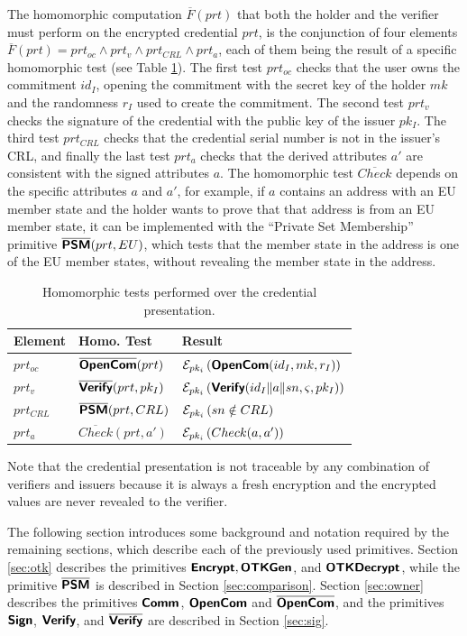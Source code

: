 The homomorphic computation $\overline{F}(prt)$ that both the holder and the verifier must perform on the encrypted credential $prt$, is the conjunction of four elements $\overline{F}(prt) = prt_{oc} \wedge prt_v \wedge prt_{CRL} \wedge prt_a$, each of them being the result of a specific homomorphic test (see Table \ref{tab:hcomp}).
The first test $prt_{oc}$ checks that the user owns the commitment $id_I$, opening the commitment with the secret key of the holder $mk$ and the randomness $r_I$ used to create the commitment. The second test $prt_v$ checks the signature of the credential with the public key of the issuer $pk_I$. The third test $prt_{CRL}$ checks that the credential serial number is not in the issuer's CRL, and finally the last test $prt_a$ checks that the derived attributes $a'$ are consistent with the signed attributes $a$. The homomorphic test $\overline{Check}$ depends on the specific attributes $a$ and $a'$, for example, if $a$ contains an address with an EU member state and the holder wants to prove that that address is from an EU member state, it can be implemented with the ``Private Set Membership'' primitive $\overline{\bkw{PSM}}(prt,EU)$, which tests that the member state in the address is one of the EU member states, without revealing the member state in the address. 

\begin{table}[ht]
    \renewcommand*{\arraystretch}{1.3}
    \centering
    \begin{tabular}{l|l|l}\hline
         Element & Homo. Test & Result \\\hline
         $prt_{oc}$ & $\overline{\bkw{OpenCom}}(prt)$ & $\senc{\bkw{OpenCom}(id_I,mk,r_I)}{pk_i}$ \\\hline
         $prt_{v}$ & $\overline{\bkw{Verify}}(prt,pk_I)$ & $\senc{\bkw{Verify}(id_I \|a\|sn,\varsigma,pk_I)}{pk_i}$\\\hline
         $prt_{CRL}$ & $\overline{\bkw{PSM}}(prt,CRL)$ & $\senc{sn \notin CRL}{pk_i}$\\\hline
         $prt_a$ & $\overline{Check}(prt,a')$ & $\senc{Check(a,a')}{pk_i}$\\\hline
    \end{tabular}
    \caption{Homomorphic tests performed over the credential presentation.}
    \label{tab:hcomp}
\end{table}

Note that the credential presentation is not traceable by any combination of verifiers and issuers because it is always a fresh encryption and the encrypted values are never revealed to the verifier. 

The following section introduces some background and notation required by the remaining sections, which describe each of the previously used primitives. Section \ref{sec:otk} describes the primitives $\bkw{Encrypt},\bkw{OTKGen}$, and $\bkw{OTKDecrypt}$, while the primitive $\overline{\bkw{PSM}}$ is described in Section \ref{sec:comparison}. Section \ref{sec:owner} describes the primitives $\bkw{Comm}$, $\bkw{OpenCom}$ and $\overline{\bkw{OpenCom}}$, and the primitives $\bkw{Sign}$, $\bkw{Verify}$, and $\overline{\bkw{Verify}}$ are described in Section \ref{sec:sig}.
